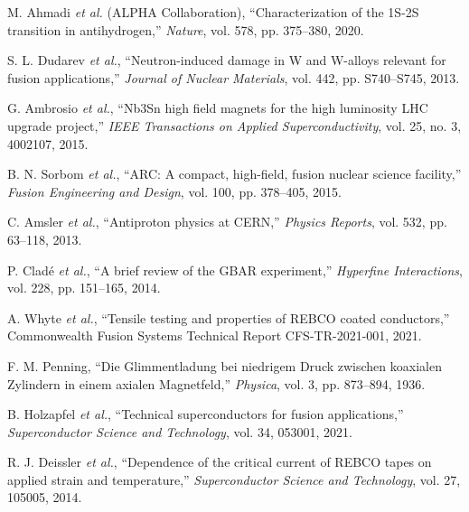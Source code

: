 \documentclass[10pt,twocolumn]{article}
\begin{document}
\begin{thebibliography}{25}
M. Ahmadi \emph{et al.} (ALPHA Collaboration), ``Characterization of the 1S-2S transition in antihydrogen,'' \textit{Nature}, vol. 578, pp. 375--380, 2020.

S. L. Dudarev \emph{et al.}, ``Neutron-induced damage in W and W-alloys relevant for fusion applications,'' \textit{Journal of Nuclear Materials}, vol. 442, pp. S740--S745, 2013.

G. Ambrosio \emph{et al.}, ``Nb3Sn high field magnets for the high luminosity LHC upgrade project,'' \textit{IEEE Transactions on Applied Superconductivity}, vol. 25, no. 3, 4002107, 2015.

B. N. Sorbom \emph{et al.}, ``ARC: A compact, high-field, fusion nuclear science facility,'' \textit{Fusion Engineering and Design}, vol. 100, pp. 378--405, 2015.

C. Amsler \emph{et al.}, ``Antiproton physics at CERN,'' \textit{Physics Reports}, vol. 532, pp. 63--118, 2013.

P. Cladé \emph{et al.}, ``A brief review of the GBAR experiment,'' \textit{Hyperfine Interactions}, vol. 228, pp. 151--165, 2014.

A. Whyte \emph{et al.}, ``Tensile testing and properties of REBCO coated conductors,'' Commonwealth Fusion Systems Technical Report CFS-TR-2021-001, 2021.

F. M. Penning, ``Die Glimmentladung bei niedrigem Druck zwischen koaxialen Zylindern in einem axialen Magnetfeld,'' \textit{Physica}, vol. 3, pp. 873--894, 1936.

B. Holzapfel \emph{et al.}, ``Technical superconductors for fusion applications,'' \textit{Superconductor Science and Technology}, vol. 34, 053001, 2021.

R. J. Deissler \emph{et al.}, ``Dependence of the critical current of REBCO tapes on applied strain and temperature,'' \textit{Superconductor Science and Technology}, vol. 27, 105005, 2014.

\end{thebibliography}
\end{document}

